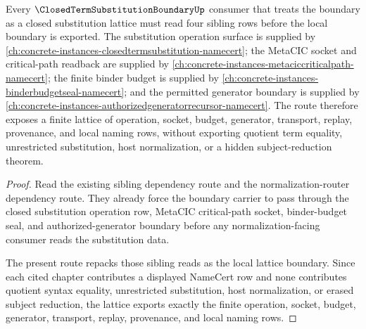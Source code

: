 \begin{theorem}
\label{thm:closed-term-substitution-boundary-sibling-lattice-route}
Every $\ClosedTermSubstitutionBoundaryUp$ consumer that treats the boundary as a closed substitution lattice must read four sibling rows before the local boundary is exported. The substitution operation surface is supplied by \autoref{ch:concrete-instances-closedtermsubstitution-namecert}; the MetaCIC socket and critical-path readback are supplied by \autoref{ch:concrete-instances-metaciccriticalpath-namecert}; the finite binder budget is supplied by \autoref{ch:concrete-instances-binderbudgetseal-namecert}; and the permitted generator boundary is supplied by \autoref{ch:concrete-instances-authorizedgeneratorrecursor-namecert}. The route therefore exposes a finite lattice of operation, socket, budget, generator, transport, replay, provenance, and local naming rows, without exporting quotient term equality, unrestricted substitution, host normalization, or a hidden subject-reduction theorem.
\end{theorem}
\begin{proof}
Read the existing sibling dependency route and the normalization-router dependency route. They already force the boundary carrier to pass through the closed substitution operation row, MetaCIC critical-path socket, binder-budget seal, and authorized-generator boundary before any normalization-facing consumer reads the substitution data.

The present route repacks those sibling reads as the local lattice boundary. Since each cited chapter contributes a displayed NameCert row and none contributes quotient syntax equality, unrestricted substitution, host normalization, or erased subject reduction, the lattice exports exactly the finite operation, socket, budget, generator, transport, replay, provenance, and local naming rows.
\end{proof}

